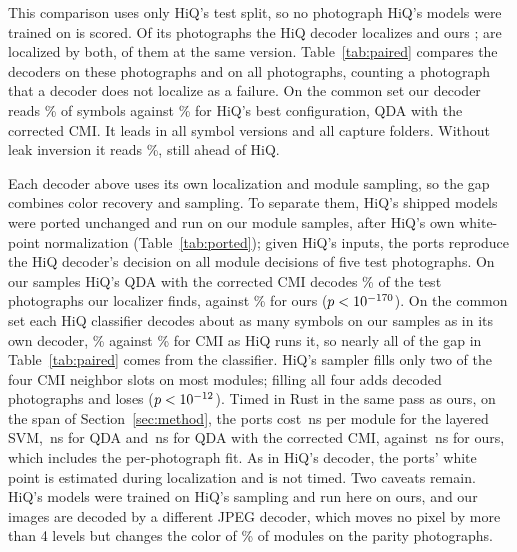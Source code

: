 This comparison uses only HiQ's test split, so no photograph HiQ's models were trained on is
scored. Of its \PairTest{} photographs the HiQ decoder localizes \PairHiqLocalized{} and ours
\PairOursLocalized; \PairBoth{} are localized by both, \PairCommon{} of them at the same
version. Table~\ref{tab:paired} compares the decoders on these photographs and
on all photographs, counting a photograph that a decoder does not localize as a failure.
On the common set our decoder reads \PairCommonOurs\% of symbols against \PairCommonHiq\%
for HiQ's best configuration, QDA with the corrected CMI. It leads in all
\PairVersionsTotal{} symbol versions and all \PairFoldersTotal{} capture folders. Without
leak inversion it reads \PairCommonOursNoDeblur\%, still ahead of HiQ.



Each decoder above uses its own localization and module sampling, so the gap combines color
recovery and sampling. To separate them, HiQ's shipped models were ported unchanged and run
on our module samples, after HiQ's own white-point normalization (Table~\ref{tab:ported}); given
HiQ's inputs, the ports reproduce the HiQ decoder's decision on all \PortParityModules{}
module decisions of five test photographs. On our samples HiQ's QDA with the corrected CMI decodes \PortCmiCode\% of the
\PortTest{} test photographs our localizer finds, against \PortOursCode\% for ours
($p<10^{-170}$). On the common set each HiQ classifier decodes about as many symbols on our
samples as in its own decoder, \PortCmiShippedCodeCommon\% against \PortCmiShippedEndToEnd\% for
CMI as HiQ runs it, so nearly all of the gap in Table~\ref{tab:paired} comes from the
classifier.
HiQ's sampler fills only two of the four CMI neighbor slots on most modules; filling all four
adds \PortNbrsGainOnly{} decoded photographs and loses \PortNbrsLossOnly{} ($p<10^{-12}$).
Timed in Rust in the same pass as ours, on the span of Section~\ref{sec:method}, the ports
cost \PortLsvmNs\,ns per module for the layered SVM, \PortQdaNs\,ns for QDA and \PortCmiNs\,ns
for QDA with the corrected CMI, against \TimeChosenNs\,ns for ours, which includes the
per-photograph fit. As in HiQ's decoder, the ports' white point is estimated during
localization and is not timed.
Two caveats remain. HiQ's models were trained on HiQ's sampling and run here on ours, and our
images are decoded by a different JPEG decoder, which moves no pixel by more than 4 levels but
changes the color of \PortParityJpegPct\% of modules on the parity photographs.

